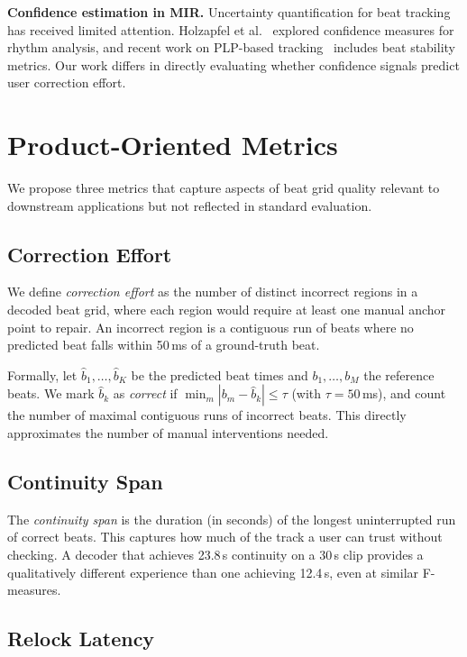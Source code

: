 \documentclass[a4paper]{article}
\begin{document}
\textbf{Confidence estimation in MIR.}
Uncertainty quantification for beat tracking has received limited attention.
Holzapfel et al.~\cite{holzapfel2014confidence} explored confidence measures for rhythm analysis,
and recent work on PLP-based tracking~\cite{plp2024realtime} includes beat stability metrics.
Our work differs in directly evaluating whether confidence signals predict user correction effort.

\section{Product-Oriented Metrics}\label{sec:metrics}

We propose three metrics that capture aspects of beat grid quality
relevant to downstream applications but not reflected in standard evaluation.

\subsection{Correction Effort}

We define \textit{correction effort} as the number of distinct incorrect regions in a decoded beat grid,
where each region would require at least one manual anchor point to repair.
An incorrect region is a contiguous run of beats where no predicted beat falls within 50\,ms
of a ground-truth beat.

Formally, let $\hat{b}_1, \ldots, \hat{b}_K$ be the predicted beat times
and $b_1, \ldots, b_M$ the reference beats.
We mark $\hat{b}_k$ as \textit{correct} if $\min_m |b_m - \hat{b}_k| \leq \tau$ (with $\tau = 50$\,ms),
and count the number of maximal contiguous runs of incorrect beats.
This directly approximates the number of manual interventions needed.

\subsection{Continuity Span}

The \textit{continuity span} is the duration (in seconds) of the longest uninterrupted run
of correct beats. This captures how much of the track a user can trust without checking.
A decoder that achieves 23.8\,s continuity on a 30\,s clip provides a qualitatively different
experience than one achieving 12.4\,s, even at similar F-measures.

\subsection{Relock Latency}
\end{document}
